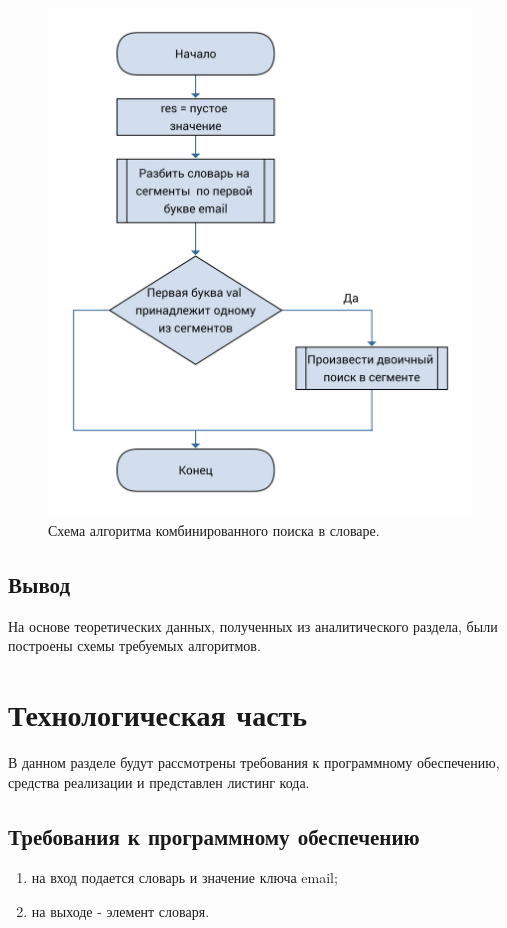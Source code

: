 \documentclass[a4paper, 12pt]{article}
\begin{document}
	\begin{figure}[h!]
		\centering \includegraphics[scale=0.07]{combo}
		\centering\caption{Схема алгоритма комбинированного поиска в словаре.}
	\end{figure}
	\subsection{Вывод}
	\hspace*{5mm} На основе теоретических данных, полученных из аналитического раздела, были построены схемы требуемых алгоритмов. 


\newpage
\section{Технологическая часть}

	\hspace*{5mm} В данном разделе будут рассмотрены требования к программному обеспечению, средства реализации и представлен листинг кода.
	\subsection{Требования к программному обеспечению}
		\begin{enumerate}
		\item на вход подается словарь и значение ключа email;
		\item на выходе - элемент словаря. 
	\end{enumerate}
\end{document}
